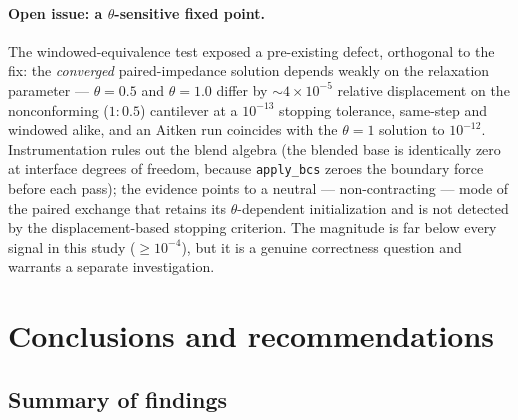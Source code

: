 \documentclass[11pt]{article}
\newcommand{\code}[1]{\texttt{#1}}
\begin{document}
\paragraph{Open issue: a $\theta$-sensitive fixed point.} The
windowed-equivalence test exposed a pre-existing defect, orthogonal to the
fix: the \emph{converged} paired-impedance solution depends weakly on the
relaxation parameter --- $\theta = 0.5$ and $\theta = 1.0$ differ by
${\sim}4\times 10^{-5}$ relative displacement on the nonconforming
($1{:}0.5$) cantilever at a $10^{-13}$ stopping tolerance, same-step and
windowed
alike, and an Aitken run coincides with the $\theta = 1$ solution to $10^{-12}$.
Instrumentation rules out the blend algebra (the blended base is
identically zero at interface degrees of freedom, because \code{apply\_bcs}
zeroes the boundary force before each pass); the evidence points to a
neutral --- non-contracting --- mode of the paired exchange that retains
its $\theta$-dependent initialization and is not detected by the
displacement-based stopping criterion. The magnitude is far below every
signal in this study ($\ge 10^{-4}$), but it is a genuine correctness
question and warrants a separate investigation.

\section{Conclusions and recommendations}
\label{sec:conclusion}

\subsection{Summary of findings}
\end{document}
